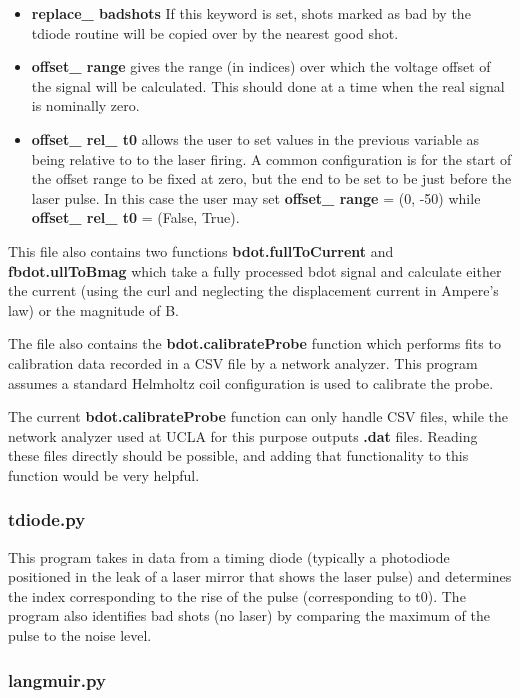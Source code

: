 \documentclass[12pt]{article}
\newcommand{\loc}[1]{{\bf \fontfamily{pcr}\selectfont #1}}
\newcommand{\todo}[1]{ \begin{tcolorbox} \centering  #1 \end{tcolorbox}}
\begin{document}
\begin{itemize}
\item \loc{replace\_ badshots} If this keyword is set, shots marked as bad by the tdiode routine will be copied over by the nearest good shot.

\item \loc{offset\_ range} gives the range (in indices) over which the voltage offset of the signal will be calculated. This should done at a time when the real signal is nominally zero. 

\item \loc{offset\_ rel\_ t0} allows the user to set values in the previous variable as being relative to to the laser firing. A common configuration is for the start of the offset range to be fixed at zero, but the end to be set to be just before the laser pulse. In this case the user may set \loc{offset\_ range} = (0, -50) while \loc{offset\_ rel\_ t0} = (False, True). 
\end{itemize}

This file also contains two functions \loc{bdot.fullToCurrent} and \loc{fbdot.ullToBmag} which take a fully processed bdot signal and calculate either the current (using the curl and neglecting the displacement current in Ampere's law) or the magnitude of B. 

The file also contains the \loc{bdot.calibrateProbe} function which performs fits to calibration data recorded in a CSV file by a network analyzer. This program assumes a standard Helmholtz coil configuration is used to calibrate the probe. 

\todo{The current \loc{bdot.calibrateProbe} function can only handle CSV files, while the network analyzer used at UCLA for this purpose outputs \loc{.dat} files. Reading these files directly should be possible, and adding that functionality to this function would be very helpful.}

\subsubsection{\loc{tdiode.py}}

This program takes in data from a timing diode (typically a photodiode positioned in the leak of a laser mirror that shows the laser pulse) and determines the index corresponding to the rise of the pulse (corresponding to t0). The program also identifies bad shots (no laser) by comparing the maximum of the pulse to the noise level. 


\subsubsection{\loc{langmuir.py}}
\end{document}
